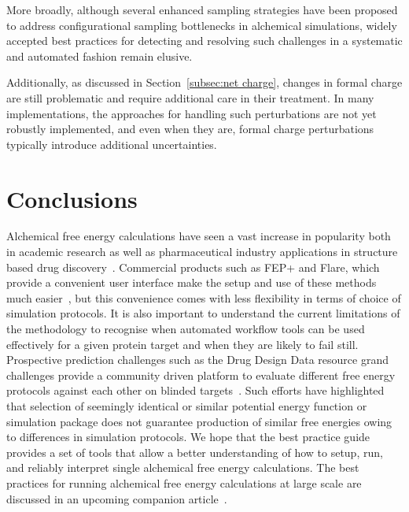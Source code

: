 \documentclass[9pt,bestpractices]{livecoms}
\begin{document}
More broadly, although several enhanced sampling strategies have been proposed to address configurational sampling bottlenecks in alchemical simulations, widely accepted best practices for detecting and resolving such challenges in a systematic and automated fashion remain elusive. 

Additionally, as discussed in Section~\ref{subsec:net charge}, changes in formal charge are still problematic and require additional care in their treatment. In many implementations, the approaches for handling such perturbations are not yet robustly implemented, and even when they are, formal charge perturbations typically introduce additional uncertainties.


\section{Conclusions}
\label{sec:conclusion}
Alchemical free energy calculations have seen a vast increase in popularity both in academic research as well as pharmaceutical industry applications in structure based drug discovery~\cite{schindler2020largescale, sherborne2016collaborating, wagner2017computational}. Commercial products such as FEP+ and Flare, which provide a convenient user interface make the setup and use of these methods much easier~\cite{wang2015accurate, kuhn2020assessment}, but this convenience comes with less flexibility in terms of choice of simulation protocols. It is also important to understand the current limitations of the methodology to recognise when automated workflow tools can be used effectively for a given protein target and when they are likely to fail still. Prospective prediction challenges such as the Drug Design Data resource grand challenges provide a community driven platform to evaluate different free energy protocols against each other on blinded targets~\cite{gaieb2018d3r, gaieb2019d3r}. Such efforts have highlighted that selection of seemingly identical or similar potential energy function or simulation package does not guarantee production of similar free energies owing to differences in simulation protocols. 
We hope that the best practice guide provides a set of tools that allow a better understanding of how to setup, run, and reliably interpret single alchemical free energy calculations. The best practices for running alchemical free energy calculations at large scale are discussed in an upcoming companion article~\cite{mey_largescale_inprep}.
\end{document}
